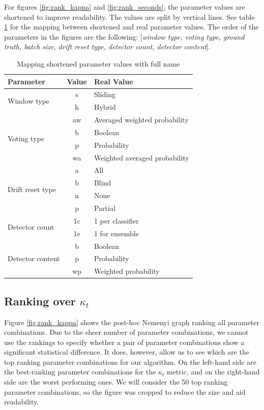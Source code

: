 For figures \ref{fig:rank_kappa} and \ref{fig:rank_seconds}, the parameter values are shortened to improve readability.
The values are split by vertical lines. See table \ref{table:ranking_parameter_values_mapping} for the mapping between shortened and real parameter values. The order of the parameters in the figures are the following: [\textit{window type, voting type, ground truth, batch size, drift reset type, detector count, detector content}].

\begin{table}[]
\centering
\caption{\label{table:ranking_parameter_values_mapping}Mapping shortened parameter values with full name}
\begin{tabular}{|l|c|l|}
\hline
\textbf{Parameter} & \textbf{Value} & \textbf{Real Value} \\ \hline
\multirow{2}{*}{Window type} & s & Sliding \\ \cline{2-3} 
 & h & Hybrid \\ \hline
\multirow{4}{*}{Voting type} & aw & Averaged weighted probability \\ \cline{2-3} 
 & b & Boolean \\ \cline{2-3} 
 & p & Probability \\ \cline{2-3} 
 & wa & Weighted averaged probability \\ \hline
\multirow{4}{*}{Drift reset type} & a & All \\ \cline{2-3} 
 & b & Blind \\ \cline{2-3} 
 & n & None \\ \cline{2-3} 
 & p & Partial \\ \hline
\multirow{2}{*}{Detector count} & 1c & 1 per classifier \\ \cline{2-3} 
 & 1e & 1 for ensemble \\ \hline
\multirow{3}{*}{Detector content} & b & Boolean \\ \cline{2-3} 
 & p & Probability \\ \cline{2-3} 
 & wp & Weighted probability \\ \hline
\end{tabular}
\end{table}

\subsection{Ranking over $\kappa_t$}
Figure \ref{fig:rank_kappa} shows the post-hoc Nemenyi graph ranking all parameter combinations. Due to the sheer number of parameter combinations, we cannot use the rankings to specify whether a pair of parameter combinations show a significant statistical difference. It does, however, allow us to see which are the top ranking parameter combinations for our algorithm. On the left-hand side are the best-ranking parameter combinations for the $\kappa_t$ metric, and on the right-hand side are the worst performing ones.
We will consider the 50 top ranking parameter combinations, so the figure was cropped to reduce the size and aid readability.

